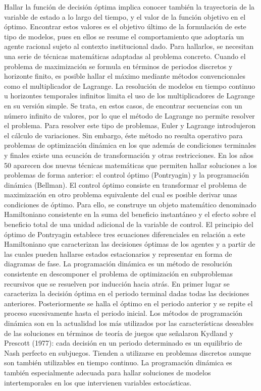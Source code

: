 \documentclass{nuevotema}
\begin{document}
Hallar la función de decisión óptima implica conocer también la trayectoria de la variable de estado a lo largo del tiempo, y el valor de la función objetivo en el óptimo. Encontrar estos valores es el objetivo último de la formulación de este tipo de modelos, pues en ellos se resume el comportamiento que adoptaría un agente racional sujeto al contexto institucional dado. Para hallarlos, se necesitan una serie de técnicas matemáticas adaptadas al problema concreto. Cuando el problema de maximización se formula en términos de periodos discretos y horizonte finito, es posible hallar el máximo mediante métodos convencionales como el multiplicador de Lagrange. La resolución de modelos en tiempo continuo u horizontes temporales infinitos limita el uso de los multiplicadores de Lagrange en su versión simple. Se trata, en estos casos, de encontrar secuencias con un número infinito de valores, por lo que el método de Lagrange no permite resolver el problema. Para resolver este tipo de problemas, Euler y Lagrange introdujeron el cálculo de variaciones. Sin embargo, éste método no resulta operativo para problemas de optimización dinámica en los que además de condiciones terminales y finales existe una ecuación de transformación y otras restricciones. En los años 50 aparecen dos nuevas técnicas matemáticas que permiten hallar soluciones a los problemas de forma anterior: el control óptimo (Pontryagin) y la programación dinámica (Bellman). El control óptimo consiste en transformar el problema de maximización en otro problema equivalente del cual es posible derivar unas condiciones de óptimo. Para ello, se construye un objeto matemático denominado Hamiltoniano consistente en la suma del beneficio instantáneo y el efecto sobre el beneficio total de una unidad adicional de la variable de control. El principio del óptimo de Pontryagin establece tres ecuaciones diferenciales en relación a este Hamiltoniano que caracterizan las decisiones óptimas de los agentes y a partir de las cuales pueden hallarse estados estacionarios y representar en forma de diagramas de fase. La programación dinámica es un método de resolución consistente en descomponer el problema de optimización en subproblemas recursivos que se resuelven por inducción hacia atrás. En primer lugar se caracteriza la decisión óptima en el periodo terminal dadas todas las decisiones anteriores. Posteriormente se halla el óptimo en el periodo anterior y se repite el proceso sucesivamente hasta el periodo inicial. Los métodos de programación dinámica son en la actualidad los más utilizados por las características deseables de las soluciones en términos de teoría de juegos que señalaron Kydland y Prescott (1977): cada decisión en un periodo determinado es un equilibrio de Nash perfecto en subjuegos. Tienden a utilizarse en problemas discretos aunque son también utilizables en tiempo continuo. La programación dinámica es también especialmente adecuada para hallar soluciones de modelos intertemporales en los que intervienen variables estocásticas. 
\end{document}
